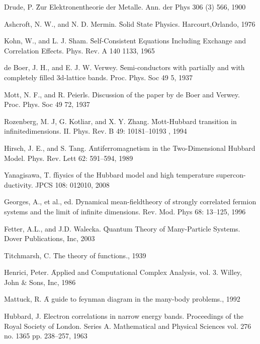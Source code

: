 %
% 

% 
% 
\begin{thebibliography}{4}

{Drude, P. \f{Zur Elektronentheorie der Metalle.} Ann. der Phys 306 (3) 566, 1900}

{Ashcroft, N. W., and N. D. Mermin. \f{Solid  State  Physics.} Harcourt,Orlando, 1976}

{Kohn, W., and L. J. Sham. \f{Self-Consistent Equations Including Exchange and Correlation Effects.} Phys. Rev. A 140 1133, 1965}

{de Boer, J. H., and E. J. W. Verwey. \f{Semi-conductors with partially and with completely filled 3d-lattice bands.} Proc. Phys. Soc 49 5, 1937}

{Mott, N. F., and R. Peierls. \f{Discussion of the paper by de Boer and Verwey.} Proc. Phys. Soc 49 72, 1937}

{Rozenberg, M. J, G. Kotliar, and X. Y. Zhang. \f{Mott-Hubbard transition in infinitedimensions. II.} Phys. Rev. B 49: 10181–10193 , 1994}

{Hirsch, J. E., and S. Tang. \f{Antiferromagnetism in the Two-Dimensional Hubbard Model.} Phys. Rev. Lett 62: 591–594, 1989}

{Yanagisawa, T. f\f{hysics of the Hubbard model and high temperature supercon-ductivity.} JPCS 108: 012010, 2008}

{Georges, A., et al., ed. \f{Dynamical mean-fieldtheory of strongly correlated fermion systems and the limit of infinite dimensions.} Rev. Mod. Phys 68: 13–125, 1996}

{Fetter, A.L., and J.D. Walecka. \f{Quantum Theory of Many-Particle Systems.} Dover Publications, Inc, 2003}

{Titchmarsh, C. \f{The theory of functions.}, 1939}

{Henrici, Peter. \f{Applied and Computational Complex Analysis, vol. 3.} Willey, John $\&$ Sons, Inc, 1986}

{Mattuck, R. \f{A guide to feynman diagram in the many-body problems.}, 1992}

{Hubbard, J. \f{Electron correlations in narrow energy bands.} Proceedings of the Royal Society of London. Series A. Mathematical and Physical Sciences vol. 276 no. 1365 pp. 238–257, 1963}


\end{thebibliography}
